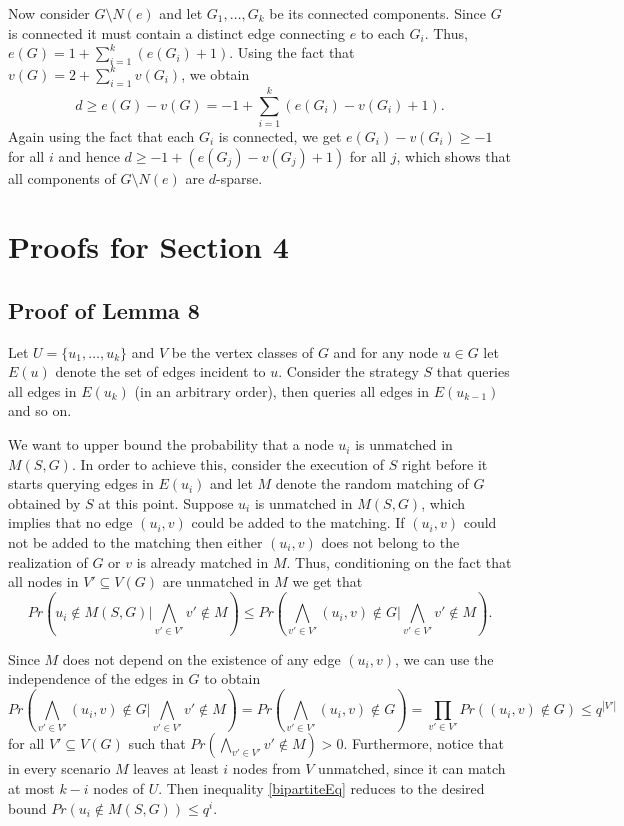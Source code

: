 \documentclass[12pt]{article}
\newcommand{\Mf}[2]{M(#1,#2)}
\begin{document}
		Now consider $G \setminus N(e)$ and let $G_1, \ldots, G_k$ be its connected components. Since $G$ is connected it must contain a distinct edge connecting $e$ to each $G_i$. Thus, $e(G) = 1 + \sum_{i = 1}^k (e(G_i) + 1)$. Using the fact that $v(G) = 2 + \sum_{i = 1}^k v(G_i)$, we obtain $$d \ge e(G) - v(G) = -1 + \sum_{i = 1}^k (e(G_i) - v(G_i) + 1).$$ Again using the fact that each $G_i$ is connected, we get $e(G_i) - v(G_i) \ge -1$ for all $i$ and hence $d \ge -1 + (e(G_j) - v(G_j) + 1)$ for all $j$, which shows that all components of $G \setminus N(e)$ are $d$-sparse.
		

\section{Proofs for Section 4}

	\subsection{Proof of Lemma 8}
	
			Let $U = \{u_1, \ldots, u_k\}$ and $V$ be the vertex classes of $G$ and for any node $u\in G$ let $E(u)$ denote the set of edges incident to $u$. Consider the strategy $S$ that queries all edges in $E(u_k)$ (in an arbitrary order), then queries all edges in $E(u_{k - 1})$ and so on. 
			
			We want to upper bound the probability that a node $u_i$ is unmatched in $\Mf{S}{G}$. In order to achieve this, consider the execution of $S$ right before it starts querying edges in $E(u_i)$ and let $M$ denote the random matching of $G$ obtained by $S$ at this point. Suppose $u_i$ is unmatched in $\Mf{S}{G}$, which implies that no edge $(u_i,v)$ could be added to the matching. If $(u_i, v)$ could not be added to the matching then either $(u_i,v)$ does not belong to the realization of $G$ or $v$ is already matched in $M$. Thus, conditioning on the fact that all nodes in $V' \subseteq V(G)$ are unmatched in $M$ we get that 
\begin{equation}
				Pr\left(u_i \notin \Mf{S}{G} \Big| \bigwedge_{v' \in V'} v' \notin M \right) \le Pr\left(\bigwedge_{v' \in V'} (u_i, v) \notin G \Big | \bigwedge_{v' \in V'} v' \notin M\right). \label{bipartiteEq}
			\end{equation} 
			
			Since $M$ does not depend on the existence of any edge $(u_i,v)$, we can use the independence of the edges in $G$ to obtain $$Pr\left(\bigwedge_{v' \in V'} (u_i, v) \notin G \Big | \bigwedge_{v' \in V'} v' \notin M\right) = Pr\left(\bigwedge_{v' \in V'} (u_i, v) \notin G \right) = \prod_{v' \in V'} Pr((u_i, v) \notin G) \le q^{|V'|}$$ for all $V' \subseteq V(G)$ such that $Pr(\bigwedge_{v' \in V'} v' \notin M) > 0$. Furthermore, notice that in every scenario $M$ leaves at least $i$ nodes from $V$ unmatched, since it can match at most $k - i$ nodes of $U$. Then inequality \eqref{bipartiteEq} reduces to the desired bound $Pr(u_i \notin \Mf{S}{G}) \le q^i$. 
			
\end{document}
